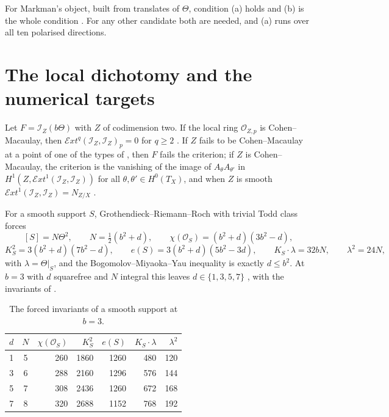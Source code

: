 \documentclass[11pt]{amsart}
\theoremstyle{definition}
\theoremstyle{remark}
\newcommand{\cO}{\mathcal{O}}
\newcommand{\cI}{\mathcal{I}}
\newcommand{\cExt}{\mathcal{E}xt}
\begin{document}
For Markman's object, built from translates of $\Theta$, condition (a) holds
and (b) is the whole condition \cite[Corollary~18.30]{BMB}. For any other
candidate both are needed, and (a) runs over all ten polarised directions.

\section{The local dichotomy and the numerical targets}\label{sec:targets}

Let $F=\cI_{Z}(b\Theta)$ with $Z$ of codimension two. If the local ring
$\cO_{Z,p}$ is Cohen--Macaulay, then $\cExt^{q}(\cI_{Z},\cI_{Z})_{p}=0$ for
$q\ge2$ \cite[Theorem~18.48]{BMB}. If $Z$ fails to be Cohen--Macaulay at a
point of one of the types of \cite[Remark~18.49]{BMB}, then $F$ fails the
criterion; if $Z$ is Cohen--Macaulay, the criterion is the vanishing of the
image of $A_{\theta}A_{\theta'}$ in $H^{1}(Z,\cExt^{1}(\cI_{Z},\cI_{Z}))$ for
all $\theta,\theta'\in H^{0}(T_{X})$, and when $Z$ is smooth
$\cExt^{1}(\cI_{Z},\cI_{Z})=N_{Z/X}$ \cite[Corollary~18.50]{BMB}.

For a smooth support $S$, Grothendieck--Riemann--Roch with trivial Todd class
forces \cite[Theorem~18.40]{BMB}
\[
  [S]=N\Theta^{2},\qquad N=\tfrac12(b^{2}+d),\qquad
  \chi(\cO_{S})=(b^{2}+d)(3b^{2}-d),
\]
\[
  K_{S}^{2}=3(b^{2}+d)(7b^{2}-d),\qquad e(S)=3(b^{2}+d)(5b^{2}-3d),\qquad
  K_{S}\cdot\lambda=32bN,\qquad\lambda^{2}=24N,
\]
with $\lambda=\Theta|_{S}$, and the Bogomolov--Miyaoka--Yau inequality is
exactly $d\le b^{2}$. At $b=3$ with $d$ squarefree and $N$ integral this
leaves $d\in\{1,3,5,7\}$ \cite[Corollary~18.41]{BMB}, with the invariants of
.

\begin{table}[ht]
\centering
\begin{tabular}{@{}ccrrrrr@{}}
\toprule
$d$ & $N$ & $\chi(\cO_S)$ & $K_S^2$ & $e(S)$ & $K_S\cdot\lambda$ & $\lambda^2$\\
\midrule
1 & 5 & 260 & 1860 & 1260 & 480 & 120\\
3 & 6 & 288 & 2160 & 1296 & 576 & 144\\
5 & 7 & 308 & 2436 & 1260 & 672 & 168\\
7 & 8 & 320 & 2688 & 1152 & 768 & 192\\
\bottomrule
\end{tabular}
\caption{The forced invariants of a smooth support at $b=3$.}
\label{tab:targets}
\end{table}
\end{document}
